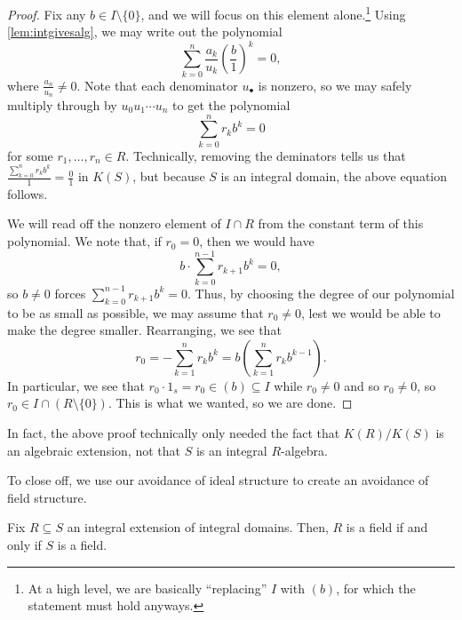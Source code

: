 \begin{proof}
	Fix any $b\in I\setminus\{0\}$, and we will focus on this element alone.\footnote{At a high level, we are basically ``replacing'' $I$ with $(b)$, for which the statement must hold anyways.} Using \autoref{lem:intgivesalg}, we may write out the polynomial
	\[\sum_{k=0}^n\frac{a_k}{u_k}\left(\frac b1\right)^k=0,\]
	where $\frac{a_n}{u_n}\ne0$. Note that each denominator $u_\bullet$ is nonzero, so we may safely multiply through by $u_0u_1\cdots u_n$ to get the polynomial
	\[\sum_{k=0}^nr_kb^k=0\]
	for some $r_1,\ldots,r_n\in R$. Technically, removing the deminators tells us that $\frac{\sum_{k=0}^nr_kb^k}1=\frac01$ in $K(S)$, but because $S$ is an integral domain, the above equation follows.

	We will read off the nonzero element of $I\cap R$ from the constant term of this polynomial. We note that, if $r_0=0$, then we would have
	\[b\cdot\sum_{k=0}^{n-1}r_{k+1}b^k=0,\]
	so $b\ne0$ forces $\sum_{k=0}^{n-1}r_{k+1}b^k=0$. Thus, by choosing the degree of our polynomial to be as small as possible, we may assume that $r_0\ne0$, lest we would be able to make the degree smaller. Rearranging, we see that
	\[r_0=-\sum_{k=1}^nr_kb^k=b\left(\sum_{k=1}^nr_kb^{k-1}\right).\]
	In particular, we see that $r_0\cdot1_s=r_0\in(b)\subseteq I$ while $r_0\ne0$ and so $r_0\ne0$, so $r_0\in I\cap(R\setminus\{0\})$. This is what we wanted, so we are done.
\end{proof}
\begin{remark}[Nir]
	In fact, the above proof technically only needed the fact that $K(R)/K(S)$ is an algebraic extension, not that $S$ is an integral $R$-algebra.
\end{remark}
To close off, we use our avoidance of ideal structure to create an avoidance of field structure.
\begin{proposition}
	Fix $R\subseteq S$ an integral extension of integral domains. Then, $R$ is a field if and only if $S$ is a field.
\end{proposition}
